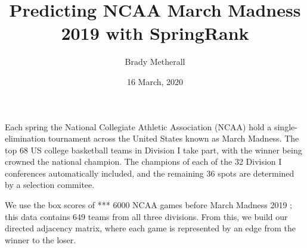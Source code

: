 \documentclass[aps,twocolumn]{revtex4-1}
\begin{document}
\title{Predicting NCAA March Madness 2019 with SpringRank}
\author{Brady Metherall}
\date{16 March, 2020}

\maketitle

Each spring the National Collegiate Athletic Association (NCAA) hold a single-elimination tournament across the United States known as March Madness. The top 68 US college basketball teams in Division I take part, with the winner being crowned the national champion. The champions of each of the 32 Division I conferences automatically included, and the remaining 36 spots are determined by a selection commitee.

We use the box scores of *** 6000 NCAA games before March Madness 2019 \cite{wirth}; this data contains 649 teams from all three divisions. From this, we build our directed adjacency matrix, where each game is represented by an edge from the winner to the loser.



\lipsum[1-3]
\end{document}
